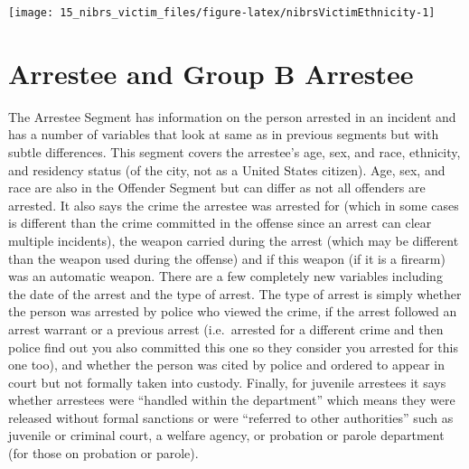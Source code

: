 \documentclass[
]{krantz}
\let\origfigure\figure
\let\endorigfigure\endfigure
\renewenvironment{figure}[1][2] {
    \expandafter\origfigure\expandafter[H]
} {
    \endorigfigure
}
\begin{document}
\begin{figure}

{\centering \texttt{[image: 15\_nibrs\_victim\_files/figure-latex/nibrsVictimEthnicity-1]} 

}

\caption{The share of victims by ethnicity, 1991-2022.}\label{fig:nibrsVictimEthnicity}
\end{figure}

\chapter{Arrestee and Group B Arrestee}\label{arrestee}

The Arrestee Segment has information on the person arrested
in an incident and has a number of variables that look at
same as in previous segments but with subtle differences.
This segment covers the arrestee's age, sex, and race,
ethnicity, and residency status (of the city, not as a
United States citizen). Age, sex, and race are also in the
Offender Segment but can differ as not all offenders are
arrested. It also says the crime the arrestee was arrested
for (which in some cases is different than the crime
committed in the offense since an arrest can clear multiple
incidents), the weapon carried during the arrest (which may
be different than the weapon used during the offense) and if
this weapon (if it is a firearm) was an automatic weapon.
There are a few completely new variables including the date
of the arrest and the type of arrest. The type of arrest is
simply whether the person was arrested by police who viewed
the crime, if the arrest followed an arrest warrant or a
previous arrest (i.e.~arrested for a different crime and
then police find out you also committed this one so they
consider you arrested for this one too), and whether the
person was cited by police and ordered to appear in court
but not formally taken into custody. Finally, for juvenile
arrestees it says whether arrestees were ``handled within
the department'' which means they were released without
formal sanctions or were ``referred to other authorities''
such as juvenile or criminal court, a welfare agency, or
probation or parole department (for those on probation or
parole).
\end{document}
